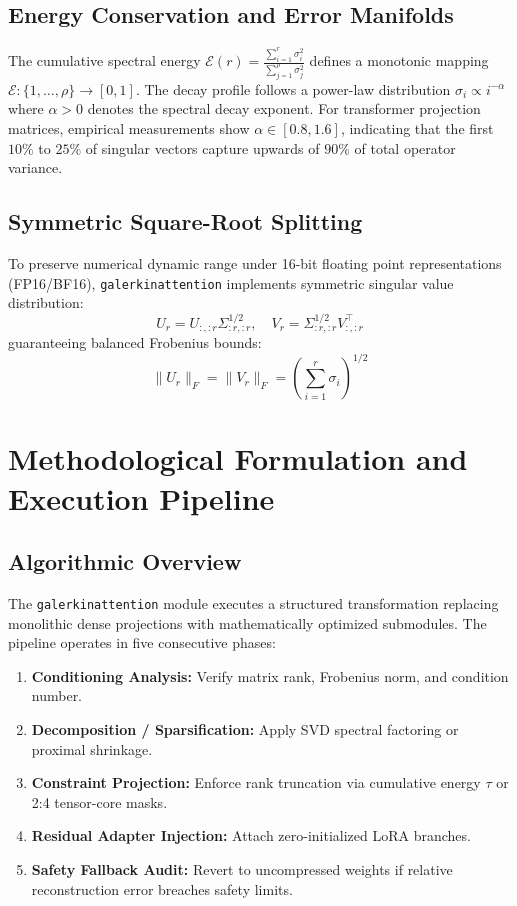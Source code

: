 \subsection{Energy Conservation and Error Manifolds}
The cumulative spectral energy $\mathcal{E}(r) = \frac{\sum_{i=1}^r \sigma_i^2}{\sum_{j=1}^\rho \sigma_j^2}$ defines a monotonic mapping $\mathcal{E}: \{1, \dots, \rho\} \to [0, 1]$. The decay profile follows a power-law distribution $\sigma_i \propto i^{-\alpha}$ where $\alpha > 0$ denotes the spectral decay exponent. For transformer projection matrices, empirical measurements show $\alpha \in [0.8, 1.6]$, indicating that the first $10\%$ to $25\%$ of singular vectors capture upwards of $90\%$ of total operator variance.

\subsection{Symmetric Square-Root Splitting}
To preserve numerical dynamic range under 16-bit floating point representations (FP16/BF16), \texttt{galerkinattention} implements symmetric singular value distribution:
\[
U_r = U_{:, :r} \Sigma_{:r, :r}^{1/2}, \quad V_r = \Sigma_{:r, :r}^{1/2} V_{:, :r}^\top
\]
guaranteeing balanced Frobenius bounds:
\[
\|U_r\|_F = \|V_r\|_F = \left( \sum_{i=1}^{r} \sigma_i \right)^{1/2}
\]


\section{Methodological Formulation and Execution Pipeline}

\subsection{Algorithmic Overview}
The \texttt{galerkinattention} module executes a structured transformation replacing monolithic dense projections with mathematically optimized submodules. The pipeline operates in five consecutive phases:
\begin{enumerate}
\item \textbf{Conditioning Analysis:} Verify matrix rank, Frobenius norm, and condition number.
\item \textbf{Decomposition / Sparsification:} Apply SVD spectral factoring or proximal shrinkage.
\item \textbf{Constraint Projection:} Enforce rank truncation via cumulative energy $\tau$ or 2:4 tensor-core masks.
\item \textbf{Residual Adapter Injection:} Attach zero-initialized LoRA branches.
\item \textbf{Safety Fallback Audit:} Revert to uncompressed weights if relative reconstruction error breaches safety limits.
\end{enumerate}

